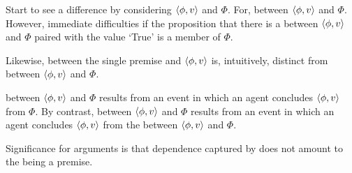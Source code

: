 \begin{note}
  Start to see a difference by considering \(\langle \phi, v \rangle\) and \(\Phi\).
  For, \ros{} between \(\langle \phi, v \rangle\) and \(\Phi\).
  However, immediate difficulties if the proposition that there is a \ros{} between \(\langle \phi, v \rangle\) and \(\Phi\) paired with the value `True' is a member of \(\Phi\).

  Likewise, \ros{} between the single premise and \(\langle \phi, v \rangle\) is, intuitively, distinct from \ros{} between \(\langle \phi, v \rangle\) and \(\Phi\).

  \ros{} between \(\langle \phi, v \rangle\) and \(\Phi\) results from an event in which an agent concludes \(\langle \phi, v \rangle\) from \(\Phi\).
  By contrast, \ros{} between \(\langle \phi, v \rangle\) and \(\Phi\) results from an event in which an agent concludes \(\langle \phi, v \rangle\) from the \ros{} between \(\langle \phi, v \rangle\) and \(\Phi\).
\end{note}

\begin{note}
  Significance for arguments is that dependence captured by \qWhyV{} does not amount to the \ros{} being a premise.
\end{note}

\subparagraph{\citeauthor{Owens:2006tw}}

